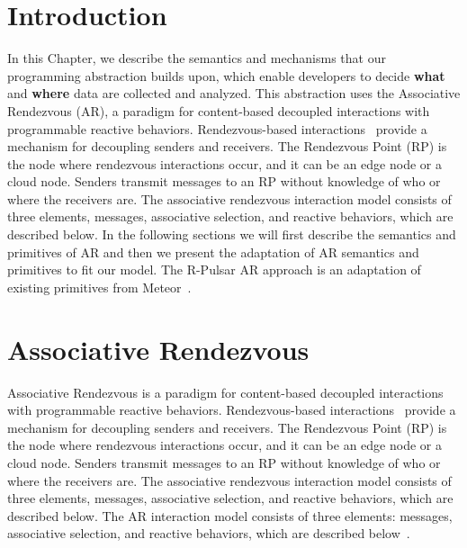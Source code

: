 \section{Introduction}

In this Chapter, we describe the semantics and mechanisms that our programming abstraction builds upon, which enable developers to decide \textbf{what} and \textbf{where} data are collected and analyzed. This abstraction uses the Associative Rendezvous (AR), a paradigm for content-based decoupled interactions with programmable reactive behaviors. Rendezvous-based interactions~\cite{AR} provide a mechanism for decoupling senders and receivers. The Rendezvous Point (RP) is the node where rendezvous interactions occur, and it can be an edge node or a cloud node. Senders transmit messages to an RP without knowledge of who or where the receivers are. The associative rendezvous interaction model consists of three elements, messages, associative selection, and reactive behaviors, which are described below. In the following sections we will first describe the semantics and primitives of AR and then we present the adaptation of AR semantics and primitives to fit our model. The R-Pulsar AR approach is an adaptation of existing primitives from Meteor~\cite{meteor2008}.

\section{Associative Rendezvous} 
Associative Rendezvous is a paradigm for content-based decoupled interactions with programmable reactive behaviors. Rendezvous-based interactions~\cite{AR} provide a mechanism for decoupling senders and receivers. The Rendezvous Point (RP) is the node where rendezvous interactions occur, and it can be an edge node or a cloud node. Senders transmit messages to an RP without knowledge of who or where the receivers are. The associative rendezvous interaction model consists of three elements, messages, associative selection, and reactive behaviors, which are described below. The AR interaction model consists of three elements: messages, associative selection, and reactive behaviors, which are described below~\cite{meteor2008}.

